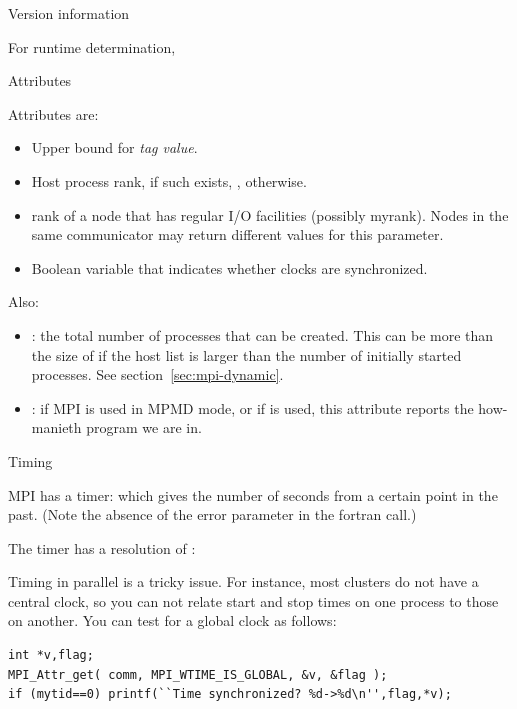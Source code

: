  {Version information}


For runtime determination,
%

 {Attributes}


Attributes are:
\begin{itemize}
\item {}
  Upper bound for \emph{tag value}.
\item {}
  Host process rank, if such exists, , otherwise.
\item {}
rank of a node that has regular I/O facilities (possibly
myrank). Nodes in the same communicator may return different values
for this parameter.
\item {}
Boolean variable that indicates whether clocks are synchronized.
\end{itemize}

Also:
\begin{itemize}
\item {}: the total number of processes
  that can be created. This can be more than the size of
   if the host list is larger than the number of
  initially started processes. See section~\ref{sec:mpi-dynamic}.
\item {}: if MPI is used in \ac{MPMD} mode, or
  if  is used, this attribute
  reports the how-manieth program we are in.
\end{itemize}

 {Timing}
\label{sec:ref:mpi-timing}

MPI has a  timer: 
%
%
which gives the number of seconds from a certain point in the past.
(Note the absence of the error parameter in the fortran call.)

The timer has a resolution of :
%

Timing in parallel is a tricky issue. For instance, most clusters do
not have a central clock, so you can not relate start and stop times
on one process to those on another. You can test for a global clock as
follows:
\begin{lstlisting}
int *v,flag;
MPI_Attr_get( comm, MPI_WTIME_IS_GLOBAL, &v, &flag );
if (mytid==0) printf(``Time synchronized? %d->%d\n'',flag,*v);
\end{lstlisting}

